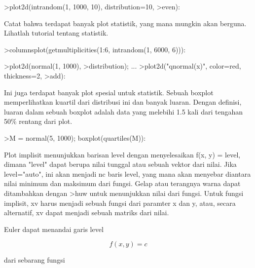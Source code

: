 \documentclass[a4paper,10pt]{article}
\begin{document}
\begin{eulernotebook}
\begin{eulercomment}
\begin{eulercomment}
\begin{eulercomment}
\begin{eulercomment}
\begin{eulerprompt}
>plot2d(intrandom(1, 1000, 10), distribution=10, >even):
\end{eulerprompt}
\begin{eulercomment}
Catat bahwa terdapat banyak plot statistik, yang mana mungkin akan
berguna. Lihatlah tutorial tentang statistik.
\end{eulercomment}
\begin{eulerprompt}
>columnsplot(getmultiplicities(1:6, intrandom(1, 6000, 6))):
\end{eulerprompt}
\begin{eulerprompt}
>plot2d(normal(1, 1000), >distribution); ...
>plot2d("qnormal(x)", color=red, thickness=2, >add):
\end{eulerprompt}
\begin{eulercomment}
Ini juga terdapat banyak plot spesial untuk statistik. Sebuah boxplot
memperlihatkan kuartil dari distribusi ini dan banyak luaran. Dengan
definisi, luaran dalam sebuah boxplot adalah data yang melebihi 1.5
kali dari tengahan 50\% rentang dari plot.
\end{eulercomment}
\begin{eulerprompt}
>M = normal(5, 1000); boxplot(quartiles(M)):
\end{eulerprompt}
\begin{eulercomment}
Plot implisit menunjukkan barisan level dengan menyelesaikan f(x, y) =
level, dimana "level" dapat berupa nilai tunggal atau sebuah vektor
dari nilai. Jika level="auto", ini akan menjadi nc baris level, yang
mana akan menyebar diantara nilai minimum dan maksimum dari fungsi.
Gelap atau terangnya warna dapat ditambahkan dengan \textgreater{}huw untuk
menunjukkan nilai dari fungsi. Untuk fungsi implisit, xv harus menjadi
sebuah fungsi dari paramter x dan y, atau, secara alternatif, xv dapat
menjadi sebuah matriks dari nilai.

Euler dapat menandai garis level\\
\end{eulercomment}
\begin{eulerformula}
\[
f(x, y) = c
\]
\end{eulerformula}
\begin{eulercomment}
dari sebarang fungsi


\end{eulercomment}
\end{eulercomment}
\end{eulercomment}
\end{eulercomment}
\end{eulercomment}
\end{eulernotebook}
\end{document}
